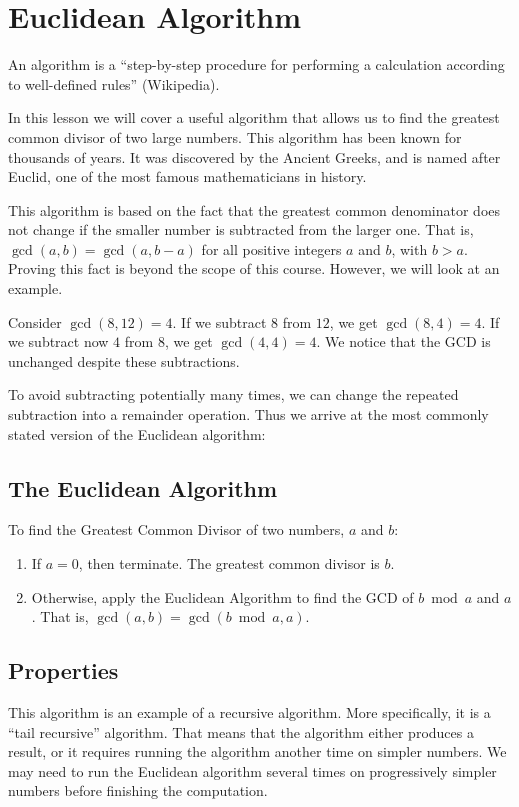 \documentclass[a4paper,10pt]{report}
\begin{document}
\section{Euclidean Algorithm}

An \gls{algorithm} is a ``step-by-step procedure for performing a calculation
according to well-defined rules'' (Wikipedia).

In this lesson we will cover a useful algorithm that allows us to find the
greatest common divisor of two large numbers. This algorithm has been known for
thousands of years. It was discovered by the Ancient Greeks, and is named after
Euclid, one of the most famous mathematicians in history.

This algorithm is based on the fact that the greatest common denominator does
not change if the smaller number is subtracted from the larger one. That is,
$\gcd(a, b) = \gcd(a, b - a)$ for all positive integers $a$ and $b$, with $b>a$.
Proving this fact is beyond the scope of this course. However, we will look at
an example.

Consider $\gcd(8, 12)=4$. If we subtract $8$ from $12$, we get $\gcd(8, 4)=4$.
If we subtract now $4$ from $8$, we get $\gcd(4, 4)=4$. We notice that the GCD
is unchanged despite these subtractions.

To avoid subtracting potentially many times, we can change the repeated
subtraction into a remainder operation. Thus we arrive at the most commonly
stated version of the Euclidean algorithm:

\subsection{The Euclidean Algorithm}

To find the Greatest Common Divisor of two numbers, $a$ and $b$:
\begin{enumerate}
 \item If $a=0$, then terminate. The greatest common divisor is $b$.
 \item Otherwise, apply the Euclidean Algorithm to find the GCD of $b \bmod a$
 and $a$. That is, $\gcd(a, b) = \gcd(b \bmod a, a)$.
\end{enumerate}

\subsection{Properties}

This algorithm is an example of a recursive algorithm. More specifically, it is
a ``tail recursive'' algorithm. That means that the algorithm either produces a
result, or it requires running the algorithm another time on simpler numbers. We
may need to run the Euclidean algorithm several times on progressively simpler
numbers before finishing the computation.
\end{document}
